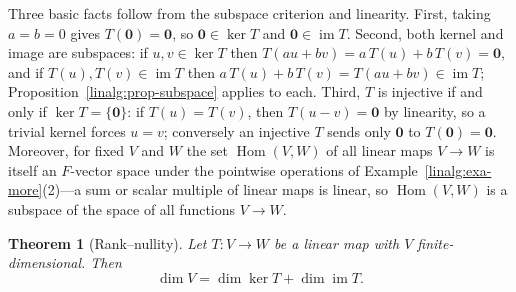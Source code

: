 \documentclass[11pt,a4paper]{article}
\newtheorem{theorem}{Theorem}[section]
\theoremstyle{definition}
\theoremstyle{remark}
\DeclareMathOperator{\Hom}{Hom}
\DeclareMathOperator{\img}{im}
\begin{document}
Three basic facts follow from the subspace criterion and linearity.
First, taking
\(a = b = 0\) gives \(T(\mathbf 0) = \mathbf 0\), so
\(\mathbf 0 \in \ker T\) and \(\mathbf 0 \in \img T\). Second, both
kernel and image are subspaces: if \(u, v \in \ker T\) then
\(T(au + bv) = a\,T(u) + b\,T(v) = \mathbf 0\), and if
\(T(u), T(v) \in \img T\) then \(a\,T(u) + b\,T(v) = T(au + bv)
\in \img T\); Proposition~\ref{linalg:prop-subspace} applies to each.
Third, \(T\) is injective if and only if \(\ker T = \{\mathbf 0\}\): if
\(T(u) = T(v)\), then \(T(u - v) = \mathbf 0\) by linearity, so a
trivial kernel forces \(u = v\); conversely an injective \(T\) sends
only \(\mathbf 0\) to \(T(\mathbf 0) = \mathbf 0\). Moreover, for fixed
\(V\) and \(W\) the set \(\Hom(V, W)\) of all linear maps
\(V \to W\) is itself an \(F\)-vector space under the pointwise
operations of Example~\ref{linalg:exa-more}(2)---a sum or scalar
multiple of linear maps is linear, so \(\Hom(V, W)\) is a subspace of
the space of all functions \(V \to W\).

\begin{theorem}[Rank--nullity]\label{linalg:thm-rank-nullity}
Let \(T \colon V \to W\) be a linear map with \(V\)
finite-dimensional. Then
\[
\dim V = \dim \ker T + \dim \img T .
\]
\end{theorem}
\end{document}
